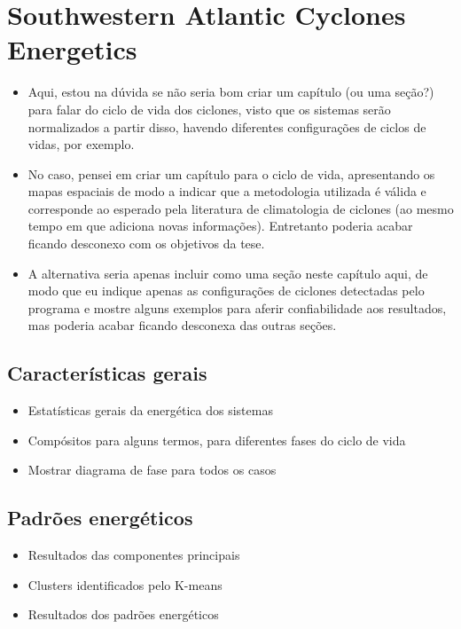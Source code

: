 \chapter{ Southwestern Atlantic Cyclones Energetics} \label{energetic_patterns}


\begin{itemize}
    \item Aqui, estou na dúvida se não seria bom criar um capítulo (ou uma seção?) para falar do ciclo de vida dos ciclones, visto que os sistemas serão normalizados a partir disso, havendo diferentes configurações de ciclos de vidas, por exemplo. 
    \item No caso, pensei em criar um capítulo para o ciclo de vida, apresentando os mapas espaciais de modo a indicar que a metodologia utilizada é válida e corresponde ao esperado pela literatura de climatologia de ciclones (ao mesmo tempo em que adiciona novas informações). Entretanto poderia acabar ficando desconexo com os objetivos da tese. 
    \item A alternativa seria apenas incluir como uma seção neste capítulo aqui, de modo que eu indique apenas as configurações de ciclones detectadas pelo programa e mostre alguns exemplos para aferir confiabilidade aos resultados, mas poderia acabar ficando desconexa das outras seções.
\end{itemize}

\section{Características gerais}
\begin{itemize}
    \item     Estatísticas gerais da energética dos sistemas
    \item     Compósitos para alguns termos, para diferentes fases do ciclo de vida
    \item Mostrar diagrama de fase para todos os casos

\end{itemize}

\section{Padrões energéticos}
\begin{itemize}
    \item Resultados das componentes principais
    \item Clusters identificados pelo K-means
    \item Resultados dos padrões energéticos

\end{itemize}

